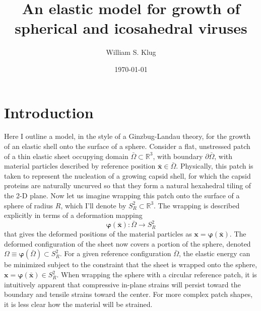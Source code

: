 \documentclass[
pre,
 twocolumn,
amsmath,
amssymb
]{revtex4}
\begin{document}
\title{An elastic model for growth of spherical and icosahedral viruses}

\author{William S. Klug}
%

\date{\today}

\begin{abstract}


\end{abstract}


\maketitle

\section{Introduction} 
Here I outline a model, in the style of a Ginzbug-Landau theory, for the growth of an elastic shell onto the surface of a sphere.  Consider a flat, unstressed patch of a thin elastic sheet occupying domain $\bar{\Omega}\subset \mathbb{R}^3$, with boundary $\partial\bar{\Omega}$, with material particles described by reference position $\bar{\bm{x}}\in\bar{\Omega}$.  Physically, this patch is taken to represent the nucleation of a growing capsid shell, for which the capsid proteins are naturally uncurved so that  they form a natural hexahedral tiling of the 2-D plane.  Now let us imagine wrapping this patch onto the surface of a sphere of radius $R$, which I'll denote by $S^2_R\subset\mathbb{R}^3$.  The wrapping is described explicitly in terms of a deformation mapping 
\[
\bm{\varphi}(\bar{\bm{x}}):\bar{\Omega}\to S^2_R
\]
that gives the deformed positions of the material particles as $\bm{x} = \bm{\varphi}(\bar{\bm{x}})$.  The deformed configuration of the sheet now covers a portion of the sphere, denoted $\Omega\equiv \bm{\varphi}(\bar{\Omega})\subset S^2_R$.   For a given reference configuration $\bar{\Omega}$, the elastic energy can be minimized subject to the constraint that the sheet is wrapped onto the sphere, $\bm{x}=\bm{\varphi}(\bar{\bm{x}})\in S^2_R$.  When wrapping the sphere with a circular reference patch, it is intuitively apparent that compressive in-plane strains will persist toward the boundary and tensile strains toward the center.  For more complex patch shapes, it is less clear how the material will be strained.  
\end{document}
